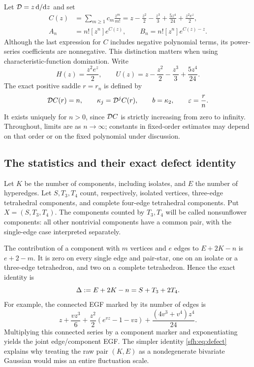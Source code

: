 Let $\mathcal D=z\,\mathrm d/\mathrm d z$ and set
\begin{align}
 C(z)&=\sum_{m\ge1}c_m\frac{z^m}{m!}
 =z-\frac{z^2}{2}-\frac{z^3}{3}+\frac{5z^4}{24}
       +\frac{z^2e^z}{2},\label{sfh:eq:C}\\
 A_n&=n![z^n]e^{C(z)},\qquad B_n=n![z^n]e^{C(z)-z}.\label{sfh:eq:AB}
\end{align}
Although the last expression for $C$ includes negative polynomial terms, its power-series coefficients are nonnegative. This distinction matters when using characteristic-function domination. Write
\[
 H(z)=\frac{z^2e^z}{2},\qquad
 U(z)=z-\frac{z^2}{2}-\frac{z^3}{3}+\frac{5z^4}{24}.
\]
The exact positive saddle $r=r_n$ is defined by
\begin{equation}\label{sfh:eq:saddle}
 \mathcal D C(r)=n,\qquad \kappa_j=\mathcal D^j C(r),\qquad b=\kappa_2,
 \qquad \varepsilon=\frac rn.
\end{equation}
It exists uniquely for $n>0$, since $\mathcal D C$ is strictly increasing from zero to infinity. Throughout, limits are as $n\to\infty$; constants in fixed-order estimates may depend on that order or on the fixed polynomial under discussion.

\subsection{The statistics and their exact defect identity}
Let $K$ be the number of components, including isolates, and $E$ the number of hyperedges. Let $S,T_3,T_4$ count, respectively, isolated vertices, three-edge tetrahedral components, and complete four-edge tetrahedral components. Put $X=(S,T_3,T_4)$. The components counted by $T_3,T_4$ will be called nonsunflower components: all other nontrivial components have a common pair, with the single-edge case interpreted separately.

The contribution of a component with $m$ vertices and $e$ edges to $E+2K-n$ is $e+2-m$. It is zero on every single edge and pair-star, one on an isolate or a three-edge tetrahedron, and two on a complete tetrahedron. Hence the exact identity is
\begin{equation}\label{sfh:eq:defect}
 \Delta:=E+2K-n=S+T_3+2T_4.
\end{equation}
For example, the connected EGF marked by its number of edges is
\[
 z+\frac{vz^3}{6}+\frac{z^2}{2}(e^{vz}-1-vz)
      +\frac{(4v^3+v^4)z^4}{24}.
\]
Multiplying this connected series by a component marker and exponentiating yields the joint edge/component EGF. The simpler identity \eqref{sfh:eq:defect} explains why treating the raw pair $(K,E)$ as a nondegenerate bivariate Gaussian would miss an entire fluctuation scale.

